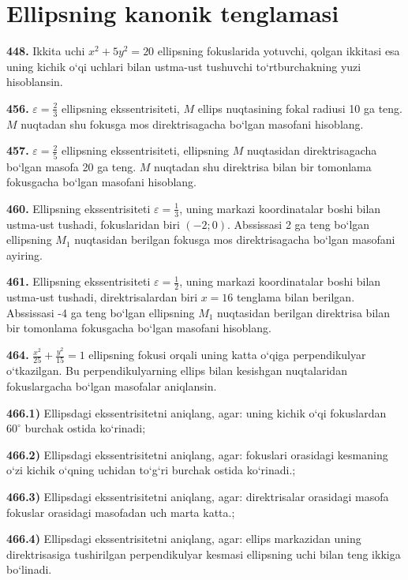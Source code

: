 \section{Ellipsning kanonik tenglamasi}



\textbf{448.} Ikkita uchi $x^2+5 y^2=20$ ellipsning fokuslarida yotuvchi, qolgan ikkitasi esa uning kichik o‘qi uchlari bilan ustma-ust tushuvchi to‘rtburchakning yuzi hisoblansin.

\textbf{456.} $\varepsilon=\frac{2}{3}$ ellipsning ekssentrisiteti, $M$ ellips nuqtasining fokal radiusi 10 ga teng. $M$ nuqtadan shu fokusga mos direktrisagacha bo‘lgan masofani hisoblang.

\textbf{457.} $\varepsilon=\frac{2}{5}$ ellipsning ekssentrisiteti, ellipsning $M$ nuqtasidan direktrisagacha bo‘lgan masofa 20 ga teng. $M$ nuqtadan shu direktrisa bilan bir tomonlama fokusgacha bo‘lgan masofani hisoblang.

\textbf{460.} Ellipsning ekssentrisiteti $\varepsilon=\frac{1}{3}$, uning markazi koordinatalar boshi bilan ustma-ust tushadi, fokuslaridan biri $ (-2; 0) $. Abssissasi 2 ga teng bo‘lgan ellipsning $M_1$ nuqtasidan berilgan fokusga mos direktrisagacha bo‘lgan masofani ayiring.

\textbf{461.} Ellipsning ekssentrisiteti $\varepsilon=\frac{1}{2}$, uning markazi koordinatalar boshi bilan ustma-ust tushadi, direktrisalardan biri $x=16$ tenglama bilan berilgan. Abssissasi -4 ga teng bo‘lgan ellipsning $M_1$ nuqtasidan berilgan direktrisa bilan bir tomonlama fokusgacha bo‘lgan masofani hisoblang.

\textbf{464.} $\frac{x^2}{25}+\frac{y^2}{15}=1$ ellipsning fokusi orqali uning katta o‘qiga perpendikulyar o‘tkazilgan. Bu perpendikulyarning ellips bilan kesishgan nuqtalaridan fokuslargacha bo‘lgan masofalar aniqlansin.

\textbf{466.1)} Ellipsdagi ekssentrisitetni aniqlang, agar: uning kichik o‘qi fokuslardan $60^{\circ}$ burchak ostida ko‘rinadi;

\textbf{466.2)} Ellipsdagi ekssentrisitetni aniqlang, agar: fokuslari orasidagi kesmaning o‘zi kichik o‘qning uchidan to‘g‘ri burchak ostida ko‘rinadi.;

\textbf{466.3)} Ellipsdagi ekssentrisitetni aniqlang, agar: direktrisalar orasidagi masofa fokuslar orasidagi masofadan uch marta katta.;

\textbf{466.4)} Ellipsdagi ekssentrisitetni aniqlang, agar: ellips markazidan uning direktrisasiga tushirilgan perpendikulyar kesmasi ellipsning uchi bilan teng ikkiga bo‘linadi.

